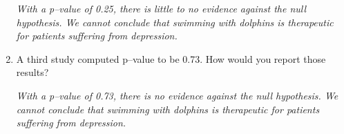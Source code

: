 \begin{enumerate}
\begin{key}
  {\it       With a p--value of 0.25, there is little to no evidence
      against the null hypothesis.  We cannot conclude that
      swimming with dolphins is therapeutic for patients suffering
      from depression.  }
\end{key}



    \item  A third study computed p--value to be 0.73. How would you
      report those results?   
\begin{students}
\vspace*{4cm}
\end{students}

\begin{key}
  {\it        With a p--value of 0.73, there is  no evidence
      against the null hypothesis.  We cannot conclude that
      swimming with dolphins is therapeutic for patients suffering
      from depression. }
\end{key}



\end{enumerate}
